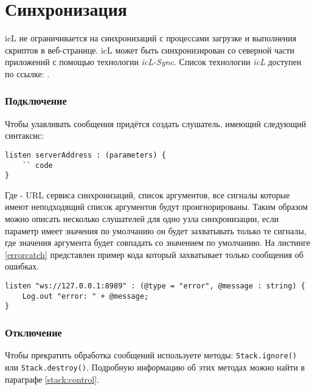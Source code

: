 \section{Синхронизация}
\label{sync}

icL не ограничивается на синхронизаций с процессами загрузке и выполнения скриптов в веб-странице. icL может быть синхронизирован со северной части приложений с помощью технологии \textit{icL-Sync}. Список технологии \textit{icL} доступен по ссылке: .

\subsubsection{Подключение}

Чтобы улавливать сообщения придётся создать слушатель, имеющий следующий синтаксис:
\begin{lstlisting}
listen serverAddress : (parameters) {
	`` code
}
\end{lstlisting}

Где  - URL сервиса синхронизаций,  список аргументов, все сигналы которые имеют неподходящий список аргументов будут проигнорированы. Таким образом можно описать несколько слушателей для одно узла синхронизации, если параметр имеет значения по умолчанию он будет захватывать только те сигналы, где значения аргумента будет совпадать со значением по умолчанию. На листинге \ref{errorcatch} представлен пример кода который захватывает только сообщения об ошибках.


\begin{lstlisting}[caption=Захват ошибок, label=errorcatch]
listen "ws://127.0.0.1:8989" : (@type = "error", @message : string) {
	Log.out "error: " + @message;
}
\end{lstlisting}

\subsubsection{Отключение}

Чтобы прекратить обработка сообщений используете методы: \lstinline|Stack.ignore()| или \lstinline|Stack.destroy()|. Подробную информацию об этих методах можно найти в параграфе \ref{stack:control}.